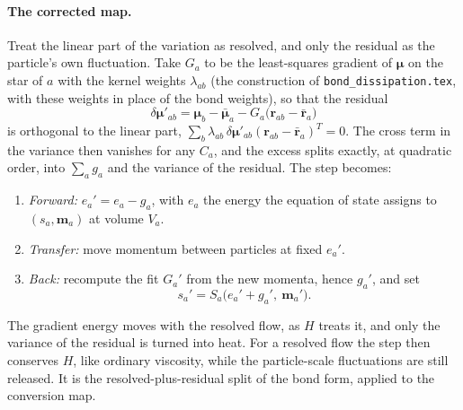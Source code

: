 \documentclass[11pt,aps,preprint,nofootinbib,superscriptaddress,tightenlines]{revtex4-2}
\def\st{\begin{equation}}
\def\stp{\end{equation}}
\let\oldparagraph\paragraph
\renewcommand{\paragraph}{\par\bigskip\oldparagraph}
\begin{document}
\paragraph{The corrected map.}  Treat the linear part of the variation as
resolved, and only the residual as the particle's own fluctuation.  Take $G_a$
to be the least-squares gradient of $\bm\mu$ on the star of $a$ with the kernel
weights $\lambda_{ab}$ (the construction of \texttt{bond\_dissipation.tex}, with
these weights in place of the bond weights), so that the residual
\st
\delta\bm\mu'_{ab}=\bm\mu_b-\bar{\bm\mu}_a-G_a\big(\bm r_{ab}-\bar{\bm r}_a\big)
\stp
is orthogonal to the linear part, $\sum_b\lambda_{ab}\,\delta\bm\mu'_{ab}(\bm r_{ab}-\bar{\bm r}_a)^T=0$.
The cross term in the variance then vanishes for any $C_a$, and the excess
splits exactly, at quadratic order, into $\sum_ag_a$ and the variance of the
residual.  The step becomes:
\begin{enumerate}
\item \emph{Forward:} $e_a'=e_a-g_a$, with $e_a$ the energy the equation of state
  assigns to $(s_a,\bm m_a)$ at volume $V_a$.
\item \emph{Transfer:} move momentum between particles at fixed $e_a'$.
\item \emph{Back:} recompute the fit $G_a'$ from the new momenta, hence $g_a'$, and
  set
  \st
  s_a'=S_a\big(e_a'+g_a',\ \bm m_a'\big).
  \stp
\end{enumerate}
The gradient energy moves with the resolved flow, as $H$ treats it, and only the
variance of the residual is turned into heat.  For a resolved flow the step
then conserves $H$, like ordinary viscosity, while the particle-scale
fluctuations are still released.  It is the resolved-plus-residual split of the
bond form, applied to the conversion map.
\end{document}
